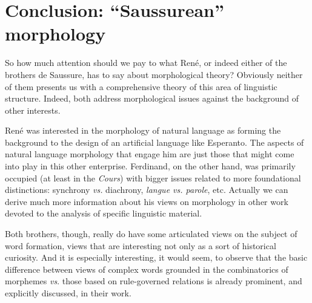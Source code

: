 \documentclass[output=paper]{langsci/langscibook}
\begin{document}
\section{Conclusion: ``Saussurean'' morphology}
\label{sec:morphology-conclusion}

So how much attention should we pay to what René, or indeed either of
the brothers de Saussure, has to say about morphological theory?
 Obviously neither of them presents us with a comprehensive theory of
this area of linguistic structure. Indeed, both address morphological
issues against the background of other interests.

René was interested in the morphology of natural language as forming
the background to the design of an artificial language like
Esperanto. The aspects of natural language morphology that engage him
are just those that might come into play in this other enterprise.
Ferdinand, on the other hand, was primarily occupied (at least in the
\textsl{Cours}) with bigger issues related to more foundational
distinctions: synchrony \emph{vs.} diachrony, \emph{langue
  vs. parole}, etc.  Actually we can derive much more information about his views
on morphology in other work devoted to the analysis of specific
linguistic material.

Both brothers, though, really do have some articulated views on the
subject of word formation, views that are interesting not only as a
sort of historical curiosity.  And it is especially interesting, it
would seem, to observe that the basic difference between views of
complex words grounded in the combinatorics of morphemes
\emph{vs}. those based on rule-governed relations is already
prominent, and explicitly discussed, in their work.


\sloppy
\printbibliography[heading=subbibliography,notkeyword=this] 
\end{document}
